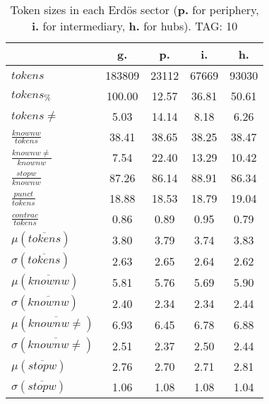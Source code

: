 \begin{table}[h!]
\begin{center}
\begin{tabular}{| l || c | c | c | c |}\hline
 & {\bf g.} & {\bf p.} & {\bf i.} & {\bf h.} \\\hline\hline
$tokens$ & 183809  & 23112  & 67669  & 93030 \\
$tokens_{\%}$ & 100.00  & 12.57  & 36.81  & 50.61 \\
$tokens \neq$ & 5.03  & 14.14  & 8.18  & 6.26 \\\hline
$\frac{knownw}{tokens}$ & 38.41  & 38.65  & 38.25  & 38.47 \\
$\frac{knownw \neq}{knownw}$ & 7.54  & 22.40  & 13.29  & 10.42 \\\hline
$\frac{stopw}{knownw}$ & 87.26  & 86.14  & 88.91  & 86.34 \\
$\frac{punct}{tokens}$ & 18.88  & 18.53  & 18.79  & 19.04 \\
$\frac{contrac}{tokens}$ & 0.86  & 0.89  & 0.95  & 0.79 \\\hline\hline
$\mu(\overline{tokens})$ & 3.80  & 3.79  & 3.74  & 3.83 \\
$\sigma(\overline{tokens})$ & 2.63  & 2.65  & 2.64  & 2.62 \\\hline
$\mu(\overline{knownw})$ & 5.81  & 5.76  & 5.69  & 5.90 \\
$\sigma(\overline{knownw})$ & 2.40  & 2.34  & 2.34  & 2.44 \\\hline
$\mu(\overline{knownw \neq})$ & 6.93  & 6.45  & 6.78  & 6.88 \\
$\sigma(\overline{knownw \neq})$ & 2.51  & 2.37  & 2.50  & 2.44 \\\hline
$\mu(\overline{stopw})$ & 2.76  & 2.70  & 2.71  & 2.81 \\
$\sigma(\overline{stopw})$ & 1.06  & 1.08  & 1.08  & 1.04 \\\hline
\end{tabular}
\caption{Token sizes in each Erd\"os sector ({{\bf p.}} for periphery, {{\bf i.}} for intermediary, {{\bf h.}} for hubs). TAG: 10}
\end{center}
\end{table}